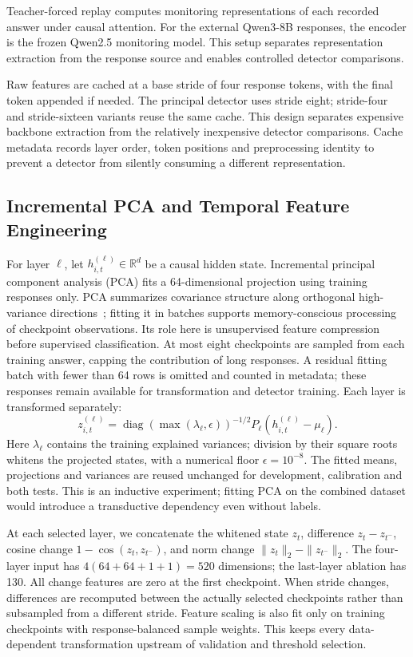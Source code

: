 Teacher-forced replay computes monitoring representations of each recorded answer under causal attention. For the external Qwen3-8B responses, the encoder is the frozen Qwen2.5 monitoring model. This setup separates representation extraction from the response source and enables controlled detector comparisons.

Raw features are cached at a base stride of four response tokens, with the final token appended if needed. The principal detector uses stride eight; stride-four and stride-sixteen variants reuse the same cache. This design separates expensive backbone extraction from the relatively inexpensive detector comparisons. Cache metadata records layer order, token positions and preprocessing identity to prevent a detector from silently consuming a different representation.

\subsection{Incremental PCA and Temporal Feature Engineering}
For layer $\ell$, let $h^{(\ell)}_{i,t}\in\mathbb R^d$ be a causal hidden state. Incremental principal component analysis (PCA) fits a 64-dimensional projection using training responses only. PCA summarizes covariance structure along orthogonal high-variance directions~\cite{jolliffe2016pca}; fitting it in batches supports memory-conscious processing of checkpoint observations. Its role here is unsupervised feature compression before supervised classification. At most eight checkpoints are sampled from each training answer, capping the contribution of long responses. A residual fitting batch with fewer than 64 rows is omitted and counted in metadata; these responses remain available for transformation and detector training. Each layer is transformed separately:
\begin{equation*}
 z^{(\ell)}_{i,t}=\operatorname{diag}(\max(\lambda_\ell,\epsilon))^{-1/2}
 P_\ell(h^{(\ell)}_{i,t}-\mu_\ell).
\end{equation*}
Here $\lambda_\ell$ contains the training explained variances; division by their square roots whitens the projected states, with a numerical floor $\epsilon=10^{-8}$. The fitted means, projections and variances are reused unchanged for development, calibration and both tests. This is an inductive experiment; fitting PCA on the combined dataset would introduce a transductive dependency even without labels.

\PCAVarianceEN{}

At each selected layer, we concatenate the whitened state $z_t$, difference $z_t-z_{t^-}$, cosine change $1-\cos(z_t,z_{t^-})$, and norm change $\|z_t\|_2-\|z_{t^-}\|_2$. The four-layer input has $4(64+64+1+1)=520$ dimensions; the last-layer ablation has 130. All change features are zero at the first checkpoint. When stride changes, differences are recomputed between the actually selected checkpoints rather than subsampled from a different stride. Feature scaling is also fit only on training checkpoints with response-balanced sample weights. This keeps every data-dependent transformation upstream of validation and threshold selection.

